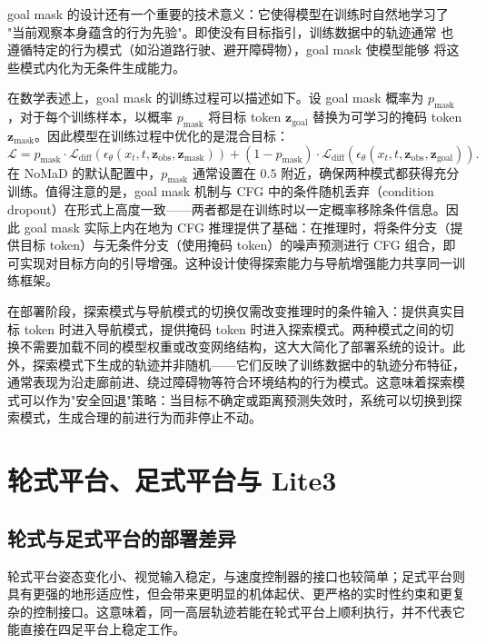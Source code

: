 goal mask 的设计还有一个重要的技术意义：它使得模型在训练时自然地学习了
"当前观察本身蕴含的行为先验"。即使没有目标指引，训练数据中的轨迹通常
也遵循特定的行为模式（如沿道路行驶、避开障碍物），goal mask 使模型能够
将这些模式内化为无条件生成能力。

在数学表述上，goal mask 的训练过程可以描述如下。设 goal mask 概率为 $p_{\text{mask}}$，对于每个训练样本，以概率 $p_{\text{mask}}$ 将目标 token $\mathbf{z}_{\text{goal}}$ 替换为可学习的掩码 token $\mathbf{z}_{\text{mask}}$。因此模型在训练过程中优化的是混合目标：
\begin{equation}
\mathcal{L} = p_{\text{mask}} \cdot \mathcal{L}_{\text{diff}}(\epsilon_\theta(x_t, t, \mathbf{z}_{\text{obs}}, \mathbf{z}_{\text{mask}})) + (1 - p_{\text{mask}}) \cdot \mathcal{L}_{\text{diff}}(\epsilon_\theta(x_t, t, \mathbf{z}_{\text{obs}}, \mathbf{z}_{\text{goal}})).
\end{equation}
在 NoMaD 的默认配置中，$p_{\text{mask}}$ 通常设置在 $0.5$ 附近，确保两种模式都获得充分训练。值得注意的是，goal mask 机制与 CFG 中的条件随机丢弃（condition dropout）在形式上高度一致——两者都是在训练时以一定概率移除条件信息。因此 goal mask 实际上内在地为 CFG 推理提供了基础：在推理时，将条件分支（提供目标 token）与无条件分支（使用掩码 token）的噪声预测进行 CFG 组合，即可实现对目标方向的引导增强。这种设计使得探索能力与导航增强能力共享同一训练框架。

在部署阶段，探索模式与导航模式的切换仅需改变推理时的条件输入：提供真实目标 token 时进入导航模式，提供掩码 token 时进入探索模式。两种模式之间的切换不需要加载不同的模型权重或改变网络结构，这大大简化了部署系统的设计。此外，探索模式下生成的轨迹并非随机——它们反映了训练数据中的轨迹分布特征，通常表现为沿走廊前进、绕过障碍物等符合环境结构的行为模式。这意味着探索模式可以作为"安全回退"策略：当目标不确定或距离预测失效时，系统可以切换到探索模式，生成合理的前进行为而非停止不动。

\section{轮式平台、足式平台与 Lite3}

\subsection{轮式与足式平台的部署差异}

轮式平台姿态变化小、视觉输入稳定，与速度控制器的接口也较简单；足式平台则具有更强的地形适应性，但会带来更明显的机体起伏、更严格的实时性约束和更复杂的控制接口\cite{hwangbo2019anymal,lee2020learning}。这意味着，同一高层轨迹若能在轮式平台上顺利执行，并不代表它能直接在四足平台上稳定工作。

